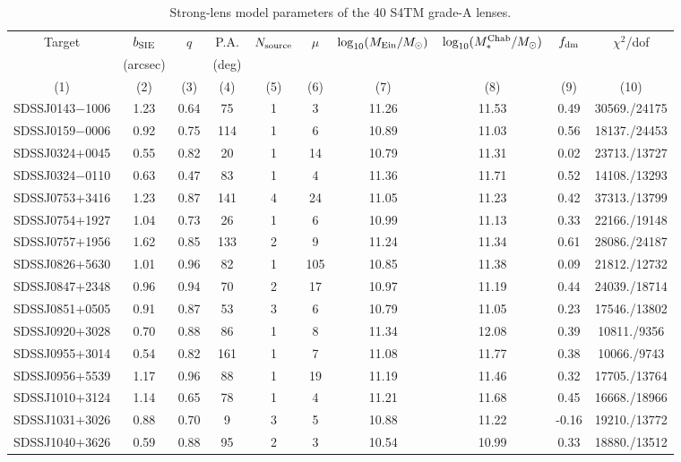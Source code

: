 \documentclass{emulateapj}
\begin{document}
\begin{table*}[htbp]
\begin{center}
\caption{\label{tb:tb2} Strong-lens model parameters of the 40 S4TM grade-A lenses.}
\begin{tabular}{c c c c c c c c c c}
\hline \hline
Target & $b_{\rm SIE}$ & $q$ & P.A. & $N_{\rm source}$ & $\mu$ & $\log_{10} (M_{\rm Ein}/M_{\odot})$ & $\log_{10} (M_*^{\rm Chab}/M_{\odot})$ & $f_{\rm dm}$ & $\chi^2$/dof \\
 & (arcsec) & & (deg) & & & & & & \\
(1) & (2) & (3) & (4) & (5) & (6) & (7) & (8) & (9) & (10)\\
\hline
SDSSJ0143$-$1006 & 1.23 & 0.64 & 75 & 1 & 3 & 11.26 & 11.53 & 0.49 & 30569./24175 \\ 
SDSSJ0159$-$0006 & 0.92 & 0.75 & 114 & 1 & 6 & 10.89 & 11.03 & 0.56 & 18137./24453 \\ 
SDSSJ0324$+$0045 & 0.55 & 0.82 & 20 & 1 & 14 & 10.79 & 11.31 & 0.02 & 23713./13727 \\ 
SDSSJ0324$-$0110 & 0.63 & 0.47 & 83 & 1 & 4 & 11.36 & 11.71 & 0.52 & 14108./13293 \\ 
SDSSJ0753$+$3416 & 1.23 & 0.87 & 141 & 4 & 24 & 11.05 & 11.23 & 0.42 & 37313./13799 \\ 
SDSSJ0754$+$1927 & 1.04 & 0.73 & 26 & 1 & 6 & 10.99 & 11.13 & 0.33 & 22166./19148 \\ 
SDSSJ0757$+$1956 & 1.62 & 0.85 & 133 & 2 & 9 & 11.24 & 11.34 & 0.61 & 28086./24187 \\ 
SDSSJ0826$+$5630 & 1.01 & 0.96 & 82 & 1 & 105 & 10.85 & 11.38 & 0.09 & 21812./12732 \\ 
SDSSJ0847$+$2348 & 0.96 & 0.94 & 70 & 2 & 17 & 10.97 & 11.19 & 0.44 & 24039./18714 \\ 
SDSSJ0851$+$0505 & 0.91 & 0.87 & 53 & 3 & 6 & 10.79 & 11.05 & 0.23 & 17546./13802 \\ 
SDSSJ0920$+$3028 & 0.70 & 0.88 & 86 & 1 & 8 & 11.34 & 12.08 & 0.39 & 10811./9356 \\ 
SDSSJ0955$+$3014 & 0.54 & 0.82 & 161 & 1 & 7 & 11.08 & 11.77 & 0.38 & 10066./9743 \\ 
SDSSJ0956$+$5539 & 1.17 & 0.96 & 88 & 1 & 19 & 11.19 & 11.46 & 0.32 & 17705./13764 \\ 
SDSSJ1010$+$3124 & 1.14 & 0.65 & 78 & 1 & 4 & 11.21 & 11.68 & 0.45 & 16668./18966 \\ 
SDSSJ1031$+$3026 & 0.88 & 0.70 & 9 & 3 & 5 & 10.88 & 11.22 & -0.16 & 19210./13772 \\ 
SDSSJ1040$+$3626 & 0.59 & 0.88 & 95 & 2 & 3 & 10.54 & 10.99 & 0.33 & 18880./13512 \\ 

\end{tabular}
\end{center}
\end{table*}
\end{document}
